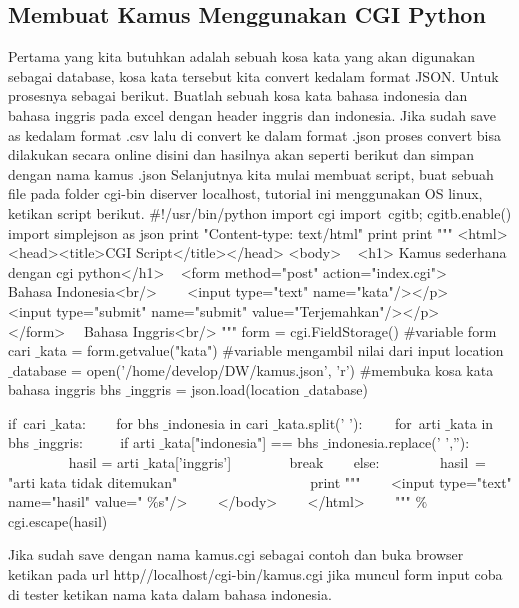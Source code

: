 \subsection{Membuat Kamus Menggunakan CGI Python} 
Pertama yang kita butuhkan adalah sebuah kosa kata yang akan digunakan sebagai database, kosa kata tersebut kita convert kedalam format JSON. Untuk prosesnya sebagai berikut. Buatlah sebuah kosa kata bahasa indonesia dan bahasa inggris pada excel dengan header inggris dan indonesia. Jika sudah save as kedalam format .csv lalu di convert ke dalam format .json proses convert  bisa dilakukan secara online disini dan hasilnya akan seperti berikut dan simpan dengan nama kamus .json  
Selanjutnya kita mulai membuat script, buat sebuah file pada folder cgi-bin diserver localhost, tutorial ini menggunakan OS linux, ketikan script berikut. 
$  \#  $!/usr/bin/python 
import cgi 
import~cgitb; cgitb.enable()   
import simplejson as json 
print "Content-type: text/html" 
print 
print """ 
<html> 
<head><title>CGI Script</title></head> 
<body> 
~ <h1> Kamus sederhana dengan cgi python</h1> 
~ <form method="post" action="index.cgi"> 
~~~ Bahasa Indonesia<br/> 
~~~ <input type="text" name="kata"/></p> 
~~~ <input type="submit" name="submit" value="Terjemahkan"/></p> 
~ </form> 
~~Bahasa Inggris<br/>   
""" 
form = cgi.FieldStorage()  $  \#  $variable form 
cari $  \_  $kata = form.getvalue("kata")  $  \#  $variable mengambil nilai dari input 
location $  \_  $database = open('/home/develop/DW/kamus.json', 'r')  $  \#  $membuka kosa kata bahasa inggris 
bhs $  \_  $inggris = json.load(location $  \_  $database) 

if~cari $  \_  $kata:~   
~~ for bhs $  \_  $indonesia in cari $  \_  $kata.split(' '):  
~~~~for~arti $  \_  $kata in bhs $  \_  $inggris:    
~~~~ if arti $  \_  $kata["indonesia"] == bhs $  \_  $indonesia.replace(' ',''): 
~~~~~~~~ hasil = arti $  \_  $kata['inggris']  
~~~~~~~ break 
~~~ else: 
~~~~~~~~hasil~= "arti kata tidak ditemukan"    
~~~~~~~~~~~~~~  
~~~ print """ 
~~~ <input type="text" name="hasil" value=" $  \%  $s"/> 
~~~ </body> 
~~~ </html> 
~~~ """  $  \%  $ cgi.escape(hasil) 

Jika sudah save dengan nama kamus.cgi sebagai contoh dan buka browser ketikan pada url http//localhost/cgi-bin/kamus.cgi jika muncul form input coba di tester ketikan nama kata dalam bahasa indonesia.
